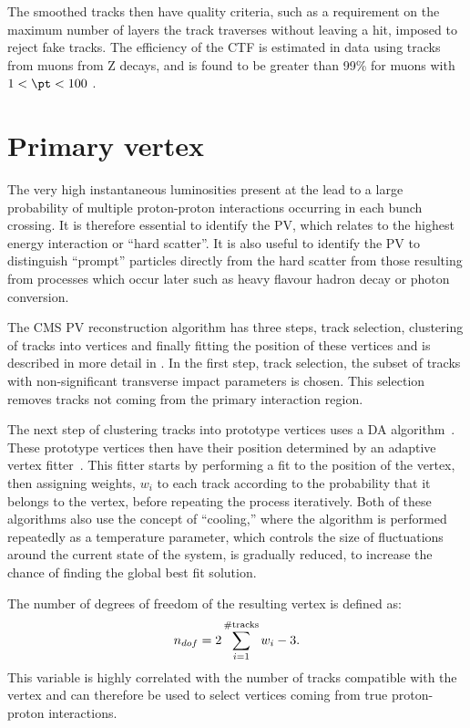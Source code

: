 The smoothed tracks then have quality criteria, such as a requirement on the maximum number of layers the track traverses without leaving a hit, imposed to reject fake tracks. The efficiency of the \ac{CTF} is estimated in data using tracks from muons from Z decays, and is found to be greater than 99\% for muons with $1<\pt<100$ \GeV.

\section{Primary vertex}
\label{sec:PV}
The very high instantaneous luminosities present at the \LHC lead to a large probability of multiple proton-proton interactions occurring in each bunch crossing. It is therefore essential to identify the \ac{PV}, which relates to the highest energy interaction or ``hard scatter''. It is also useful to identify the \ac{PV} to distinguish ``prompt'' particles directly from the hard scatter from those resulting from processes which occur later such as heavy flavour hadron decay or photon conversion.

The CMS \ac{PV} reconstruction algorithm has three steps, track selection, clustering of tracks into vertices and finally fitting the position of these vertices and is described in more detail in . In the first step, track selection, the subset of tracks with non-significant transverse impact parameters is chosen. This selection removes tracks not coming from the primary interaction region.

The next step of clustering tracks into prototype vertices uses a \ac{DA} algorithm~\cite{DetAnnealing}. These prototype vertices then have their position determined by an adaptive vertex fitter~\cite{adaptivevertex}. This fitter starts by performing a fit to the position of the vertex, then assigning weights, $w_{i}$ to each track according to the probability that it belongs to the vertex, before repeating the process iteratively. Both of these algorithms also use the concept of ``cooling,'' where the algorithm is performed repeatedly as a temperature parameter, which controls the size of fluctuations around the current state of the system, is gradually reduced, to increase the chance of finding the global best fit solution.

The number of degrees of freedom of the resulting vertex is defined as:
\begin{equation}
  \label{eq:vertdof}
  n_{dof}=2\displaystyle\sum_{i=1}^{\# \rm{tracks}}w_i -3.
\end{equation}
This variable is highly correlated with the number of tracks compatible with the vertex and can therefore be used to select vertices coming from true proton-proton interactions.


